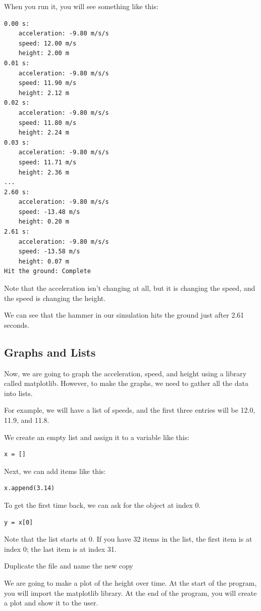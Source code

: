 When you run it, you will see something like this:
\begin{Verbatim}
0.00 s:
	acceleration: -9.80 m/s/s
	speed: 12.00 m/s
	height: 2.00 m
0.01 s:
	acceleration: -9.80 m/s/s
	speed: 11.90 m/s
	height: 2.12 m
0.02 s:
	acceleration: -9.80 m/s/s
	speed: 11.80 m/s
	height: 2.24 m
0.03 s:
	acceleration: -9.80 m/s/s
	speed: 11.71 m/s
	height: 2.36 m
...
2.60 s:
	acceleration: -9.80 m/s/s
	speed: -13.48 m/s
	height: 0.20 m
2.61 s:
	acceleration: -9.80 m/s/s
	speed: -13.58 m/s
	height: 0.07 m
Hit the ground: Complete
\end{Verbatim}

Note that the acceleration isn't changing at all, but it is changing
the speed, and the speed is changing the height.

We can see that the hammer in our simulation hits the ground just
after 2.61 seconds.

\subsection{Graphs and Lists}

Now, we are going to graph the acceleration, speed, and height using a
library called matplotlib. However, to make the graphs, we
need to gather all the data into lists.

For example, we will have a list of speeds, and the first three
entries will be 12.0, 11.9, and 11.8.

We create an empty list and assign it to a variable like this:
\begin{Verbatim}
x = []
\end{Verbatim}

Next, we can add items like this:
\begin{Verbatim}
x.append(3.14)
\end{Verbatim}

To get the first time back, we can ask for the object at index 0.
\begin{Verbatim}
y = x[0]
\end{Verbatim}
Note that the list starts at 0. If you have 32 items in the list,
the first item is at index 0; the last item is at index 31.

Duplicate the file  and name the new copy 

We are going to make a plot of the height over time. At the start of the program, you will import the
matplotlib library.  At the end of the program, you will create a plot and show it to the user.

